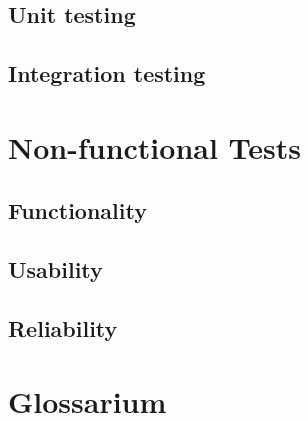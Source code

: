 \documentclass[a4paper]{article}
\begin{document}
\subsection{Unit testing}

\subsection{Integration testing}


\section{Non-functional Tests}

\subsection{Functionality}

\subsection{Usability}

\subsection{Reliability}


\section{Glossarium}
\end{document}
